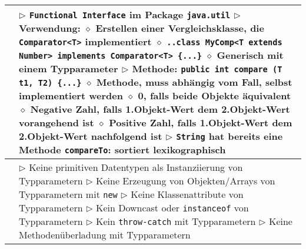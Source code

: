 \begin{longtable}{ | p{} p{} | }
	\makecell[l]{Interface Comparator} & \makecell[l]{
	$\triangleright$  \texttt{Functional Interface} im Package \texttt{java.util} \\
	$\triangleright$ Verwendung: \\
	\hspace{0.4cm} $\diamond$ Erstellen einer Vergleichsklasse, die \texttt{Comparator<T>} implementiert \\
	\hspace{0.4cm} $\diamond$ \texttt{..class MyComp<T extends Number> implements Comparator<T> \{...\}} \\
	\hspace{0.4cm} $\diamond$ Generisch mit einem Typparameter \\
	$\triangleright$ Methode: \texttt{public int compare (T t1, T2) \{...\}} \\
	\hspace{0.4cm} $\diamond$ Methode, muss abhängig vom Fall, selbst implementiert werden \\
	\hspace{0.4cm} $\diamond$ 0, falls beide Objekte äquivalent \\
	\hspace{0.4cm} $\diamond$ Negative Zahl, falls 1.Objekt-Wert dem 2.Objekt-Wert vorangehend ist \\
	\hspace{0.4cm} $\diamond$ Positive Zahl, falls 1.Objekt-Wert dem 2.Objekt-Wert nachfolgend ist \\
	$\triangleright$ \texttt{String} hat bereits eine Methode \texttt{compareTo}: sortiert lexikographisch }  \\ \hline

	\makecell[l]{Einschränkungen} & \makecell[l]{
	$\triangleright$ Keine primitiven Datentypen als Instanziierung von Typparametern \\
	$\triangleright$ Keine Erzeugung von Objekten/Arrays von Typparametern mit \texttt{new} \\
	$\triangleright$ Keine Klassenattribute von Typparametern \\
	$\triangleright$ Kein Downcast oder \texttt{instanceof} von Typparametern \\
	$\triangleright$ Kein \texttt{throw-catch} mit Typparametern \\
	$\triangleright$ Keine Methodenüberladung mit Typparametern } \\ \hline

	\end{longtable}




